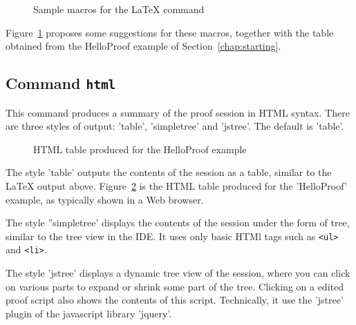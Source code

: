 \begin{figure}[t]
  \begin{center}
    
  \end{center}
  
  \caption{Sample macros for the LaTeX command}
\label{fig:latex}
\end{figure}

Figure~\ref{fig:latex} proposes some suggestions for these macros,
together with the table obtained from the HelloProof example of
Section~\ref{chap:starting}.

\subsection{Command \texttt{html}}

This command produces a summary of the proof session in HTML syntax.
There are three styles of output: 'table', 'simpletree' and
'jstree'. The default is 'table'.

\begin{figure}[t]
  \begin{center}
  \end{center}
  \caption{HTML table produced for the HelloProof example}
\label{fig:html}
\end{figure}

The style 'table' outputs the contents of the session as a table,
similar to the LaTeX output above. Figure~\ref{fig:html} is the HTML table
produced for the 'HelloProof' example, as typically shown in a Web
browser.

The style ''simpletree' displays the contents of the session under the form of tree, similar to the tree view in the IDE. It uses only basic HTMl tags such as \verb|<ul>| and \verb|<li>|.

The style 'jstree' displays a dynamic tree view of the session, where
you can click on various parts to expand or shrink some part of the
tree. Clicking on a edited proof script also shows the contents of
this script. Technically, it use the 'jstree' plugin of the javascript
library 'jquery'.

